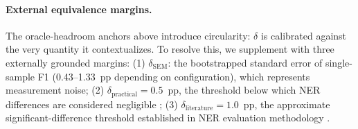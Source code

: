 \begin{table}[t]
\centering
\small
\caption{TOST equivalence testing: signals vs.\ single-sample on SciERC ($N{=}8$, $T{=}1.0$). \checkmark: equivalent at $p{<}0.05$; \texttimes: not equivalent. $\Delta$: mean F1 difference (signal $-$ single-sample).}
\label{tab:tost}
\end{table}

\paragraph{External equivalence margins.}
The oracle-headroom anchors above introduce circularity: $\delta$ is calibrated against the very quantity it contextualizes.
To resolve this, we supplement with three externally grounded margins:
(1) $\delta_{\mathrm{SEM}}$: the bootstrapped standard error of single-sample F1 (0.43--1.33~pp depending on configuration), which represents measurement noise;
(2) $\delta_{\mathrm{practical}}{=}0.5$~pp, the threshold below which NER differences are considered negligible \cite{ratinov2009design};
(3) $\delta_{\mathrm{literature}}{=}1.0$~pp, the approximate significant-difference threshold established in NER evaluation methodology \cite{bergkirkpatrick2012empirical}.


